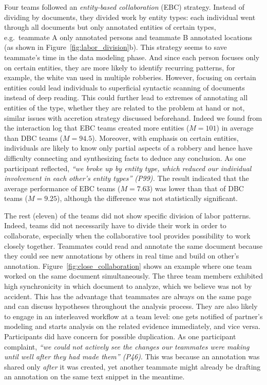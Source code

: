 Four teams followed an \emph{entity-based collaboration} (EBC)
strategy. Instead of dividing by documents, they divided work by entity
types: each individual went through all documents but only annotated
entities of certain types, e.g.~teammate A only annotated persons and
teammate B annotated locations (as shown in
Figure~\ref{fig:labor_division}b). This strategy seems to save teammate's time in the
data modeling phase. And since each person focuses only on certain entities,
they are more likely to identify recurring patterns, for example, the
white van used in multiple robberies. However, focusing on certain
entities could lead individuals to superficial syntactic scanning of
documents instead of deep reading. This could further lead to extremes
of annotating all entities of the type, whether they are related to the
problem at hand or not, similar issues with accretion strategy discussed
beforehand. Indeed we found from the interaction log that EBC teams
created more entities ($M=101$) in average than DBC teams ($M=94.5$).
Moreover, with emphasis on certain entities,
individuals are likely to know only partial aspects of a robbery and
hence have difficulty connecting and synthesizing facts to deduce any
conclusion. As one participant reflected, \emph{``we broke up by entity
type, which reduced our individual involvement in each other's entity
types'' (P99).} The result indicated that the average performance of EBC teams ($M=7.63$) was lower
than that of DBC teams ($M=9.25$), although the difference was not statistically significant.

The rest (eleven) of the teams did not show specific division of labor
patterns. Indeed, teams did not necessarily have to divide their work in
order to collaborate, especially when the collaborative tool provides
possibility to work closely together. Teammates could read and annotate
the same document because they could see new annotations by others in
real time and build on other's annotation. Figure~\ref{fig:close_collaboration}
shows an example where one team worked on the same document simultaneously.
The three team members exhibited high synchronicity in which document to
analyze, which we believe was not by accident. This has the advantage that
teammates are always on the same page and can discuss hypotheses
throughout the analysis process. They are also likely to engage in an interleaved workflow at a team level: one gets notified of partner's modeling and starts analysis on the related evidence immediately, and vice versa. Participants did have concern for
possible duplication. As one participant complaint, \emph{``we could not
actively see the changes our teammates were making until well after they
had made them'' (P46)}. This was because an annotation was shared only
\emph{after} it was created, yet another teammate might already be drafting an
annotation on the same text snippet in the meantime.

